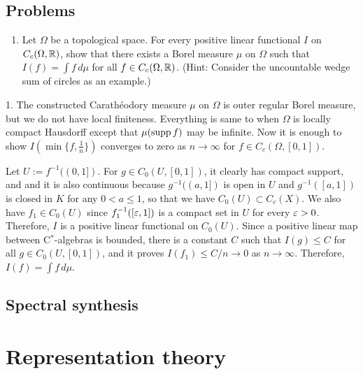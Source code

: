 \documentclass{../../large}
\begin{document}
\section*{Problems}
\begin{enumerate}
\item Let $\Omega$ be a topological space. For every positive linear functional $I$ on $C_c(\Omega,\mathbb{R})$, show that there exists a Borel measure $\mu$ on $\Omega$ such that $I(f)=\int f\,d\mu$ for all $f\in C_c(\Omega,\mathbb{R})$. (Hint: Consider the uncountable wedge sum of circles as an example.)
\end{enumerate}
\begin{sol}
1.
The constructed Carath\'eodory measure $\mu$ on $\Omega$ is outer regular Borel measure, but we do not have local finiteness.
Everything is same to when $\Omega$ is locally compact Hausdorff except that $\mu(\operatorname{supp} f)$ may be infinite.
Now it is enough to show $I(\min\{f,\frac1n\})$ converges to zero as $n\to\infty$ for $f\in C_c(\Omega,[0,1])$.

Let $U:=f^{-1}((0,1])$.
For $g\in C_0(U,[0,1])$, it clearly has compact support, and and it is also continuous because $g^{-1}((a,1])$ is open in $U$ and $g^{-1}([a,1])$ is closed in $K$ for any $0<a\le1$, so that we have $C_0(U)\subset C_c(X)$.
We also have $f_1\in C_0(U)$ since $f_1^{-1}([\varepsilon,1])$ is a compact set in $U$ for every $\varepsilon>0$.
Therefore, $I$ is a positive linear functional on $C_0(U)$.
Since a positive linear map between C$^*$-algebras is bounded, there is a constant $C$ such that $I(g)\le C$ for all $g\in C_0(U,[0,1])$, and it proves $I(f_1)\le C/n\to0$ as $n\to\infty$.
Therefore, $I(f)=\int f\,d\mu$.
\end{sol}



\section{Spectral synthesis}








\chapter{Representation theory}

\begin{prb}
\end{prb}

\begin{prb}
\end{prb}
\end{document}
